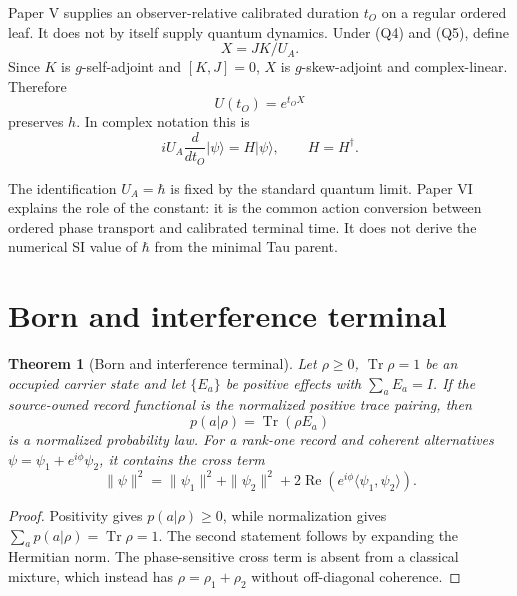 \documentclass[11pt]{article}
\newtheorem{theorem}{Theorem}
\newcommand{\Tr}{\operatorname{Tr}}
\begin{document}
Paper V supplies an observer-relative calibrated duration $t_O$ on a regular
ordered leaf.  It does not by itself supply quantum dynamics.  Under (Q4) and
(Q5), define
\begin{equation}
 X=JK/U_A.
\end{equation}
Since $K$ is $g$-self-adjoint and $[K,J]=0$, $X$ is $g$-skew-adjoint and
complex-linear.  Therefore
\begin{equation}
 U(t_O)=e^{t_O X}
 \label{eq:unitary}
\end{equation}
preserves $h$.  In complex notation this is
\begin{equation}
 iU_A\frac{d}{dt_O}|\psi\rangle=H|\psi\rangle,
 \qquad H=H^\dagger.
 \label{eq:schrodinger}
\end{equation}

The identification $U_A=\hbar$ is fixed by the standard quantum limit.  Paper
VI explains the role of the constant: it is the common action conversion
between ordered phase transport and calibrated terminal time.  It does not
derive the numerical SI value of $\hbar$ from the minimal Tau parent.

\section{Born and interference terminal}

\begin{theorem}[Born and interference terminal]
\label{thm:born}
Let $\rho\ge0$, $\Tr\rho=1$ be an occupied carrier state and let
$\{E_a\}$ be positive effects with $\sum_aE_a=I$.  If the source-owned record
functional is the normalized positive trace pairing, then
\begin{equation}
 p(a|\rho)=\Tr(\rho E_a)
 \label{eq:born}
\end{equation}
is a normalized probability law.  For a rank-one record and coherent
alternatives $\psi=\psi_1+e^{i\phi}\psi_2$, it contains the cross term
\begin{equation}
 \|\psi\|^2=\|\psi_1\|^2+\|\psi_2\|^2
 +2\operatorname{Re}\!\left(e^{i\phi}
 \langle\psi_1,\psi_2\rangle\right).
 \label{eq:interference}
\end{equation}
\end{theorem}

\begin{proof}
Positivity gives $p(a|\rho)\ge0$, while normalization gives
$\sum_ap(a|\rho)=\Tr\rho=1$.  The second statement follows by expanding the
Hermitian norm.  The phase-sensitive cross term is absent from a classical
mixture, which instead has $\rho=\rho_1+\rho_2$ without off-diagonal
coherence.
\end{proof}
\end{document}
